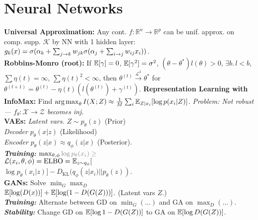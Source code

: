 \section*{Neural Networks}
\textbf{Universal Approximation:} Any cont. $f:\mathbb{R}^n\to\mathbb{R}^p$ can be unif. approx. on comp. supp. $\mathcal{K}$ by NN with 1 hidden layer: $g_k(x)=\sigma(\alpha_k+\sum_{j\to k}w_{jk}\sigma(\alpha_j+\sum_{i\to j} w_{ij}x_i))$.\\
\textbf{Robbins-Monro (root):} If $\mathbb{E}[\gamma]=0$, $\mathbb{E}[\gamma^2]=\sigma^2$, $(\theta-\theta^*)l(\theta) > 0$, $\exists b.\,l<b$, $\sum\eta(t) = \infty$, $\sum\eta(t)^2 < \infty$, then
$\theta^{(t)}\overset{\mathcal{L}^2}{\to}\theta^*$ for
$\theta^{(t+1)} = \theta^{(t)} - \eta(t)(l(\theta^{(t)})+\gamma^{(t)})$.
\textbf{Representation Learning with InfoMax:} Find $\operatorname*{arg\,max}_\theta I(X;Z) \approx \frac{1}{M}\sum_i\mathbb{E}_{Z|x_i}[\log p(x_i|Z)]$. \emph{Problem: Not robust --- $f_\theta:\mathcal{X}\to\mathcal{Z}$ becomes inj.}\\
\textbf{VAEs:} \emph{Latent vars.} $Z\sim p_\theta(z)$ (Prior)\\
\emph{Decoder} $p_\theta(x|z)$ (Likelihood)\\
\emph{Encoder} $p_\theta(z|x)\approx q_\phi(z|x)$ (Posterior).\\
\emph{\textbf{Training:}} $\max_{\theta,\phi} {\color{gray}\log p_\theta(x_i) \geq}$\\$ \mathcal{L}(x_i,\theta,\phi) = \mathrm{ELBO} = \mathbb{E}_{z\sim q_\phi}[$\\$\log p_\theta(x_i|z)] - D_{\mathrm{KL}}(q_\phi(z|x_i)||p_\theta(z))$.\\
\textbf{GANs:} Solve $\min_G\max_D$\\$\mathbb{E}[\log(D(x))] + \mathbb{E}[\log(1-D(G(Z)))]$. (Latent vars $Z$.)\\
\emph{\textbf{Training:}} Alternate between GD on $\min_G(\dots)$ and GA on $\max_D(\ldots)$.\\
\emph{\textbf{Stability:}} Change GD on $\mathbb{E}[\log 1-D(G(Z))]$ to GA on $\mathbb{E}[\log D(G(Z))]$.
